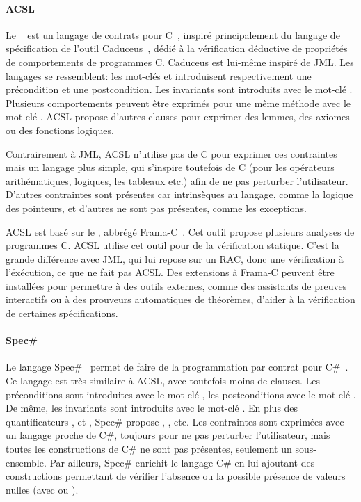 \paragraph{ACSL} Le ~ est
un langage de contrats pour C~, inspiré principalement du langage de
spécification de l'outil Caduceus~, dédié à la vérification
déductive de propriétés de comportements de programmes C. Caduceus est lui-même
inspiré de JML. Les langages se ressemblent: les mot-clés  et
 introduisent respectivement une précondition et une
postcondition. Les invariants sont introduits avec le mot-clé .
Plusieurs comportements peuvent être exprimés pour une même méthode avec le
mot-clé . ACSL propose d'autres clauses pour exprimer des
lemmes, des axiomes ou des fonctions logiques.

Contrairement à JML, ACSL n'utilise pas de C pour exprimer ces con\-train\-tes
mais un langage plus simple, qui s'inspire toutefois de C (pour les opérateurs
arithématiques, logiques, les tableaux etc.) afin de ne pas perturber
l'utilisateur. D'autres contraintes sont présentes car intrinsèques au langage,
comme la logique des pointeurs, et d'autres ne sont pas présentes, comme les
exceptions.

ACSL est basé sur le , abbrégé
Frama-C~. Cet outil propose plusieurs analyses de programmes C.
ACSL utilise cet outil pour de la vérification statique. C'est la grande
différence avec JML, qui lui repose sur un RAC, donc une vérification à
l'éxécution, ce que ne fait pas ACSL. Des extensions à Frama-C peuvent être
installées pour permettre à des outils externes, comme des assistants de preuves
interactifs ou à des prouveurs automatiques de théorèmes, d'aider à la
vérification de certaines spécifications.

\paragraph{Spec\#} Le langage Spec\#~ permet de faire de la
programmation par contrat pour C\#~. Ce langage est très similaire
à ACSL, avec toutefois moins de clauses. Les préconditions sont introduites avec
le mot-clé , les postconditions avec le mot-clé .
De même, les invariants sont introduits avec le mot-clé . En
plus des quantificateurs ,  et ,
Spec\# propose , ,  etc. Les contraintes sont
exprimées avec un langage proche de C\#, toujours pour ne pas perturber
l'utilisateur, mais toutes les constructions de C\# ne sont pas présentes,
seulement un sous-ensemble.  Par ailleurs, Spec\# enrichit le langage C\# en lui
ajoutant des constructions permettant de vérifier l'absence ou la possible
présence de valeurs nulles (avec \code{!} ou ).

